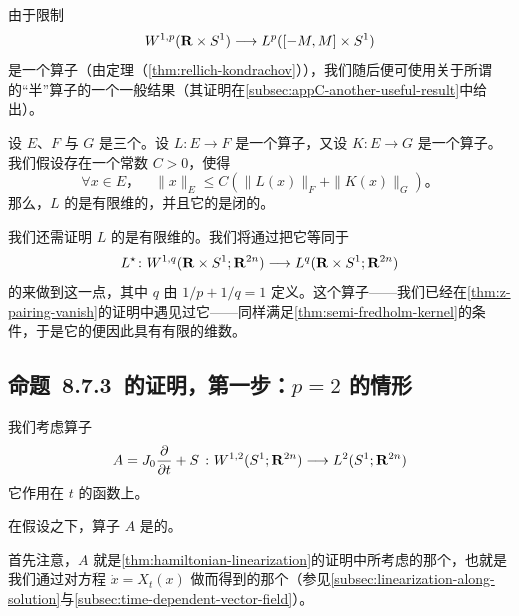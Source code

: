 由于限制
\[
W^{1,p}(\mathbf{R}\times S^{1})\longrightarrow L^{p}([-M,M]\times S^{1})
\]
是一个\trCompact{}算子（由\trRellich{}定理（\cref{thm:rellich-kondrachov}）），我们随后便可使用关于所谓的“半\trFredholm{}”算子的一个一般结果（其证明在\cref{subsec:appC-another-useful-result}中给出）。

\begin{proposition}\label{thm:semi-fredholm-kernel}
设 $E$、$F$ 与 $G$ 是三个\trBanachSpace。设 $L\colon E\to F$ 是一个算子，又设 $K\colon E\to G$ 是一个\trCompact{}算子。我们假设存在一个常数 $C>0$，使得
\[
\forall x\in E\text{，}\quad\|x\|_{E}\le C\left(\|L(x)\|_{F}+\|K(x)\|_{G}\right)\text{。}
\]
那么，$L$ 的\trKernel{}是有限维的，并且它的\trImage{}是闭的。
\end{proposition}

我们还需证明 $L$ 的\trCokernel{}是有限维的。我们将通过把它等同于\trAdjointOperator
\[
L^{\star}\colon W^{1,q}(\mathbf{R}\times S^{1};\mathbf{R}^{2n})\longrightarrow L^{q}(\mathbf{R}\times S^{1};\mathbf{R}^{2n})
\]
的\trKernel{}来做到这一点，其中 $q$ 由 $1/p+1/q=1$ 定义。这个算子——我们已经在\cref{thm:z-pairing-vanish}的证明中遇见过它——同样满足\cref{thm:semi-fredholm-kernel}的条件，于是它的\trKernel{}便因此具有有限的维数。

\subsection{命题~8.7.3~的证明，第一步：$p=2$ 的情形}
\label{subsec:proof-p2-case}

我们考虑算子
\[
A=J_0\frac{\partial}{\partial t}+S\ \colon W^{1,2}(S^{1};\mathbf{R}^{2n})\longrightarrow L^{2}(S^{1};\mathbf{R}^{2n})
\]
它作用在 $t$ 的函数上。

\begin{lemma}\label{thm:a-invertible-p2}
在\trNondegenerate{}假设之下，算子 $A$ 是\trInvertible{}的。
\end{lemma}

\begin{remark}\label{thm:a-linearized-operator}
首先注意，$A$ 就是\cref{thm:hamiltonian-linearization}的证明中所考虑的那个\trLinearOperator，也就是我们通过对\trDifferential{}方程 $\dot{x}=X_t(x)$ 做\trLinearization{}而得到的那个（参见\cref{subsec:linearization-along-solution}与\cref{subsec:time-dependent-vector-field}）。
\end{remark}

